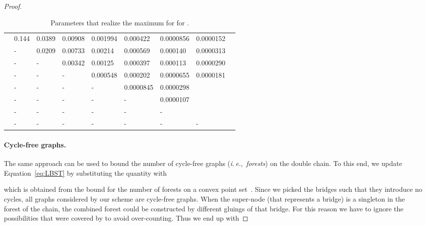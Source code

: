 \documentclass[11pt]{article}
\def\ie{{\it i.\,e.},~}
\begin{document}
\begin{proof}
\begin{table}
\centering
\begin{tabular}{l||llllllll}
  &  &  &  &  &  &  &  &  \\
  \hline
\hline
  & 0.144 & 0.0389 & 0.00908 & 0.001994 & 0.000422 & 0.0000856 & 0.0000152 &  \\
  & - & 0.0209 & 0.00733 & 0.00214 & 0.000569 & 0.000140 & 0.0000313 & \\
  & - & - & 0.00342& 0.00125 & 0.000397 & 0.000113 & 0.0000290 &  \\
  & - & - & - & 0.000548& 0.000202 & 0.0000655 & 0.0000181 &  \\
  & - & - & - & - & 0.0000845 & 0.0000298 &  &  \\
  & - & - & - & - & - & 0.0000107 &  &  \\
 & - & - & - & - & - & - &  &  \\
  & - & - & - & - & - & - & - & 
\end{tabular}
\caption{Parameters that realize the maximum
   for
 for .}
\label{tab:z8}

\end{table}



\paragraph{Cycle-free graphs.}
The same approach can be used to bound the number of cycle-free
graphs (\ie {\em forests}) on the double chain. To this end, we update
Equation~\eqref{eq:LBST} by substituting the quantity  with

which is obtained from the bound for the number of forests on a convex
point set~\cite{FN99}. Since we picked the bridges such that they introduce no cycles,
all graphs considered by our scheme are cycle-free graphs. When the
super-node (that represents a bridge) is a singleton in the forest of
the chain, the combined forest could be constructed by different
gluings of that bridge. For this reason we have to ignore the
possibilities that were covered by  to avoid
over-counting. Thus we end up with



\end{proof}
\end{document}
